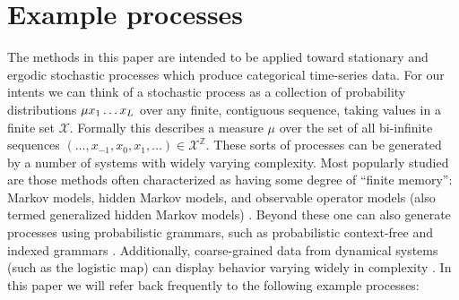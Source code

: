 \documentclass[sigconf, anonymous, review]{acmart}
\begin{document}
\section{Example processes}
The methods in this paper are intended to be applied toward stationary and
ergodic stochastic processes which produce categorical time-series data. For our
intents we can think of a stochastic process as a collection of probability
distributions $\Prob{\mu}{x_1\dots x_L}$ over any finite, contiguous sequence,
taking values in a finite set $\mathcal{X}$. Formally this describes a measure
$\mu$ over the set of all bi-infinite sequences $(\dots,x_{-1},x_0,x_1,\dots)\in
\mathcal{X}^{\mathbb{Z}}$. These sorts of processes can be generated by a number
of systems with widely varying complexity. Most popularly studied are those
methods often characterized as having some degree of ``finite memory'': Markov
models, hidden Markov models, and observable operator models (also termed
generalized hidden Markov models) \cite{Uppe97a,Jaeg00a}. Beyond these one can
also generate processes using probabilistic grammars, such as probabilistic
context-free and indexed grammars \cite{Gema00a}. Additionally, coarse-grained
data from dynamical systems (such as the logistic map) can display behavior
varying widely in complexity \cite{Crut92c}. In this paper we will refer back
frequently to the following example processes:
\end{document}
